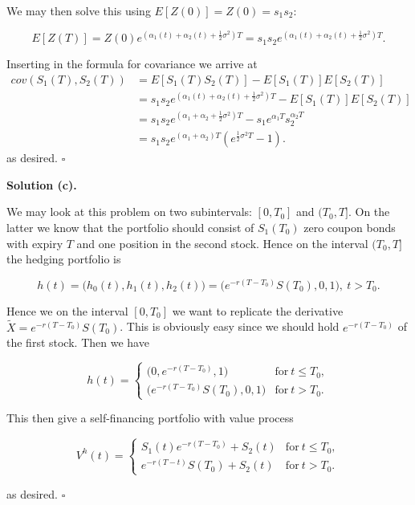\documentclass[a4paper,12pt,openany]{book}
\begin{document}
We may then solve this using \(E[Z(0)]=Z(0)=s_1s_2\):

\[
E[Z(T)]=Z(0)e^{(\alpha_1(t)+\alpha_2(t)+\frac{1}{2}\sigma^2)T}=s_1s_2e^{(\alpha_1(t)+\alpha_2(t)+\frac{1}{2}\sigma^2)T}.
\]

Inserting in the formula for covariance we arrive at
\begin{align*}
cov(S_1(T),S_2(T))&=E\left[S_1(T)S_2(T)\right]-E[S_1(T)]E[S_2(T)]\\
&=s_1s_2e^{(\alpha_1(t)+\alpha_2(t)+\frac{1}{2}\sigma^2)T}-E[S_1(T)]E[S_2(T)]\\
&=s_1s_2e^{(\alpha_1+\alpha_2+\frac{1}{2}\sigma^2)T}-s_1e^{\alpha_1T}s_2^{\alpha_2T}\\
&=s_1s_2e^{(\alpha_1+\alpha_2)T}\left(e^{\frac{1}{2}\sigma^2T}-1\right).
\end{align*}
as desired. \(\square\)

\noindent\makebox[\linewidth]{\rule{\textwidth}{0.4pt}}

\textbf{Solution (c).}

We may look at this problem on two subintervals: \([0,T_0]\) and \((T_0,T]\). On the latter we know that the portfolio should consist of \(S_1(T_0)\) zero coupon bonds with expiry \(T\) and one position in the second stock. Hence on the interval \((T_0,T]\) the hedging portfolio is

\[
h(t)=\Big(h_0(t),h_1(t),h_2(t)\Big)=\Big(e^{-r(T-T_0)}S(T_0),0,1\Big),\ t> T_0.
\]

Hence we on the interval \([0,T_0]\) we want to replicate the derivative \(\widetilde{X}=e^{-r(T-T_0)}S(T_0)\). This is obviously easy since we should hold \(e^{-r(T-T_0)}\) of the first stock. Then we have

\[
h(t)=\begin{cases}
\Big(0,e^{-r(T-T_0)},1\Big) &\text{for}\ t\le T_0,\\
\Big(e^{-r(T-T_0)}S(T_0),0,1\Big) &\text{for}\ t>T_0.
\end{cases}
\]

This then give a self-financing portfolio with value process

\[
V^h(t)=\begin{cases}
S_1(t)e^{-r(T-T_0)}+S_2(t) &\text{for}\ t\le T_0,\\
e^{-r(T-t)}S(T_0)+S_2(t) &\text{for}\ t>T_0.
\end{cases}
\]

as desired. \(\square\)

\noindent\makebox[\linewidth]{\rule{\textwidth}{0.4pt}}
\pagebreak
\end{document}
